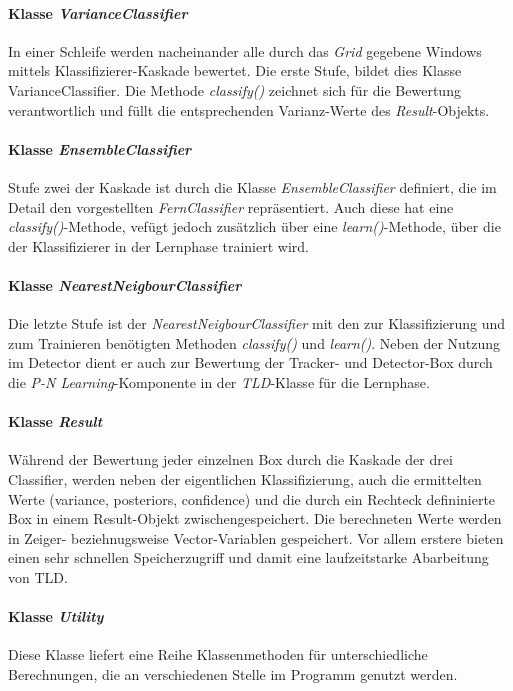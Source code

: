 \paragraph{Klasse \textit{VarianceClassifier}}
In einer Schleife werden nacheinander alle durch das \textit{Grid} gegebene Windows mittels Klassifizierer-Kaskade bewertet. Die erste Stufe, bildet dies Klasse VarianceClassifier. Die Methode \textit{classify()} zeichnet sich für die Bewertung verantwortlich und füllt die entsprechenden Varianz-Werte des \textit{Result}-Objekts.

\paragraph{Klasse \textit{EnsembleClassifier}}
Stufe zwei der Kaskade ist durch die Klasse \textit{EnsembleClassifier} definiert, die im Detail den vorgestellten \textit{FernClassifier} repräsentiert. Auch diese hat eine \textit{classify()}-Methode, vefügt jedoch zusätzlich über eine \textit{learn()}-Methode, über die der Klassifizierer in der Lernphase trainiert wird.

\paragraph{Klasse \textit{NearestNeigbourClassifier}}
Die letzte Stufe ist der \textit{NearestNeigbourClassifier} mit den zur Klassifizierung und zum Trainieren benötigten Methoden \textit{classify()} und \textit{learn()}. Neben der Nutzung im Detector dient er auch zur Bewertung der Tracker- und Detector-Box durch die \textit{P-N Learning}-Komponente in der \textit{TLD}-Klasse für die Lernphase.

\paragraph{Klasse \textit{Result}}
Während der Bewertung jeder einzelnen Box durch die Kaskade der drei Classifier, werden neben der eigentlichen Klassifizierung, auch die ermittelten Werte (variance, posteriors, confidence) und die durch ein Rechteck defininierte Box in einem Result-Objekt zwischengespeichert. Die berechneten Werte werden in Zeiger- beziehnugsweise Vector-Variablen gespeichert. Vor allem erstere bieten einen sehr schnellen Speicherzugriff und damit eine laufzeitstarke Abarbeitung von TLD.

\paragraph{Klasse \textit{Utility}}
Diese Klasse liefert eine Reihe Klassenmethoden für unterschiedliche Berechnungen, die an verschiedenen Stelle im Programm genutzt werden.

